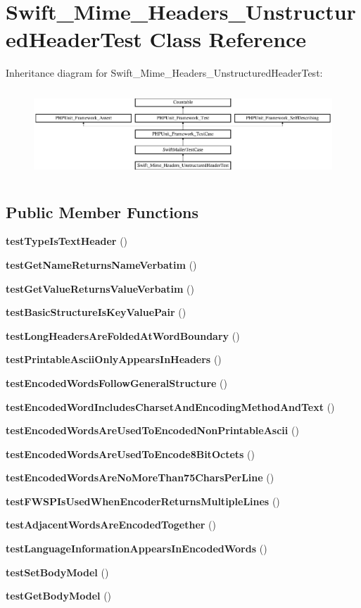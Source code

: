 \section{Swift\+\_\+\+Mime\+\_\+\+Headers\+\_\+\+Unstructured\+Header\+Test Class Reference}
\label{class_swift___mime___headers___unstructured_header_test}
Inheritance diagram for Swift\+\_\+\+Mime\+\_\+\+Headers\+\_\+\+Unstructured\+Header\+Test\+:\begin{figure}[H]
\begin{center}
\leavevmode
\includegraphics[height=3.297998cm]{class_swift___mime___headers___unstructured_header_test}
\end{center}
\end{figure}
\subsection*{Public Member Functions}
\begin{DoxyCompactItemize}
\item 
{\bf test\+Type\+Is\+Text\+Header} ()
\item 
{\bf test\+Get\+Name\+Returns\+Name\+Verbatim} ()
\item 
{\bf test\+Get\+Value\+Returns\+Value\+Verbatim} ()
\item 
{\bf test\+Basic\+Structure\+Is\+Key\+Value\+Pair} ()
\item 
{\bf test\+Long\+Headers\+Are\+Folded\+At\+Word\+Boundary} ()
\item 
{\bf test\+Printable\+Ascii\+Only\+Appears\+In\+Headers} ()
\item 
{\bf test\+Encoded\+Words\+Follow\+General\+Structure} ()
\item 
{\bf test\+Encoded\+Word\+Includes\+Charset\+And\+Encoding\+Method\+And\+Text} ()
\item 
{\bf test\+Encoded\+Words\+Are\+Used\+To\+Encoded\+Non\+Printable\+Ascii} ()
\item 
{\bf test\+Encoded\+Words\+Are\+Used\+To\+Encode8\+Bit\+Octets} ()
\item 
{\bf test\+Encoded\+Words\+Are\+No\+More\+Than75\+Chars\+Per\+Line} ()
\item 
{\bf test\+F\+W\+S\+P\+Is\+Used\+When\+Encoder\+Returns\+Multiple\+Lines} ()
\item 
{\bf test\+Adjacent\+Words\+Are\+Encoded\+Together} ()
\item 
{\bf test\+Language\+Information\+Appears\+In\+Encoded\+Words} ()
\item 
{\bf test\+Set\+Body\+Model} ()
\item 
{\bf test\+Get\+Body\+Model} ()
\end{DoxyCompactItemize}
